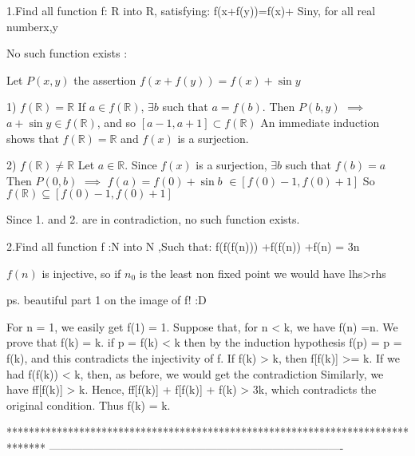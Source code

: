 \begin{solution}
	\begin{tcolorbox}1.Find all function f: R into R, satisfying: f(x+f(y))=f(x)+ Siny, for all real numberx,y\end{tcolorbox}

No such function exists :

Let $ P(x,y)$ the assertion $ f(x+f(y))=f(x)+ \sin y$

1) $ f(\mathbb R)=\mathbb R$
If $ a\in f(\mathbb R)$, $ \exists b$ such that $ a=f(b)$. Then  $ P(b,y)$ $ \implies$ $ a+\sin y\in f(\mathbb R)$, and so $ [a-1,a+1]\subset f(\mathbb R)$
An immediate induction shows that $ f(\mathbb R)=\mathbb R$ and $ f(x)$ is a surjection.

2) $ f(\mathbb R)\neq\mathbb R$
Let $ a\in\mathbb R$. Since $ f(x)$ is a surjection, $ \exists b$ such that $ f(b)=a$
Then $ P(0,b)$ $ \implies$ $ f(a)=f(0)+ \sin b$ $ \in[f(0)-1,f(0)+1]$
So $ f(\mathbb R)\subseteq[f(0)-1,f(0)+1]$

Since 1. and 2. are in contradiction, no such function exists.
\end{solution}



\begin{solution}
	\begin{tcolorbox}2.Find all function f :N into N ,Such that: f(f(f(n))) +f(f(n)) +f(n) = 3n\end{tcolorbox}

$ f(n)$ is injective, so if $ n_0$ is the least non fixed point we would have lhs>rhs  

ps. beautiful part 1 on the image of f! :D
\end{solution}



\begin{solution}
	For n = 1, we easily get f(1) = 1. Suppose that, for n < k, we have f(n) =n. We prove that f(k) = k. if p = f(k) < k then by the induction  
hypothesis f(p) = p = f(k), and this contradicts the injectivity of f. If f(k) > k, then f[f(k)] >= k. 
If we had f(f(k)) < k, then, as before, we would get the contradiction  
Similarly, we have f{f[f(k)]} > k. Hence, f{f[f(k)]} + f[f(k)] + f(k) > 3k, which contradicts the original condition. Thus f(k) = k.
\end{solution}
*******************************************************************************
-------------------------------------------------------------------------------

